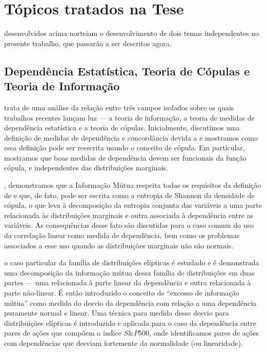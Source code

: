 \section{Tópicos tratados na Tese}
 desenvolvidos acima norteiam o desenvolvimento de dois temas independentes no presente trabalho, que passarão a ser descritos agora. 

\subsection{Dependência Estatística, Teoria de Cópulas e Teoria de Informação}

 trata de uma análise da relação entre três campos isolados sobre os quais trabalhos recentes lançam luz --- a teoria de informação, a teoria de medidas de dependência estatística e a teoria de cópulas. Inicialmente, discutimos uma definição de medidas de dependência e concordância devida a \citet{Renyi1959} e mostramos como essa definição pode ser reescrita usando o conceito de cópula. Em particular, mostramos que boas medidas de dependência devem ser funcionais da função cópula, e independentes das distribuições marginais. 

, demonstramos que a Informação Mútua respeita todas os requisitos da definição de \citet{Renyi1959} e que, de fato, pode ser escrita como a entropia de Shannon da densidade de cópula, o que leva à decomposição da entropia conjunta das variáveis a uma parte relacionada às distribuições marginais e outra associada à dependência entre as variáveis. As consequências desse fato são discutidas para o caso comum do uso da correlação linear como medida de dependência, bem como os problemas associados a esse uso quando as distribuições marginais não são normais. 

 o caso particular da família de distribuições elípticas é estudado e é demonstrada uma decomposição da informação mútua dessa família de distribuições em duas partes --- uma relacionada à parte linear da dependência e outra relacionada à parte não-linear. É então introduzido o conceito de ``excesso de informação mútua'' como medida do desvio da dependência com relação a uma dependência puramente normal e linear. Uma técnica para medida desse desvio para distribuições elípticas é introduzida e aplicada para o caso da dependência entre pares de ações que compõem o índice $S\&P500$, onde identificamos pares de ações com dependências que desviam fortemente da normalidade (ou linearidade).

